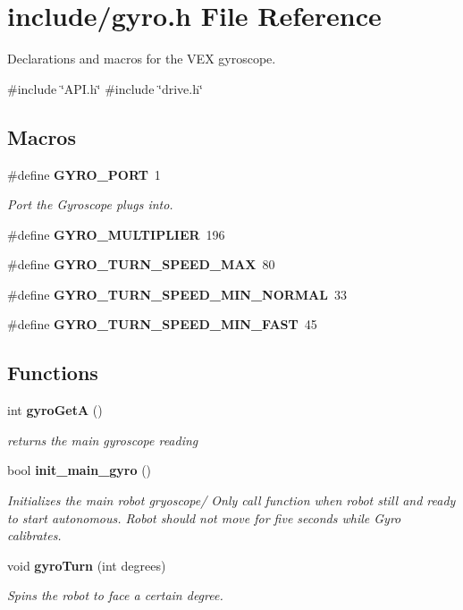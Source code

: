 \section{include/gyro.h File Reference}
\label{gyro_8h}


Declarations and macros for the V\+EX gyroscope.  


{\ttfamily \#include \char`\"{}A\+P\+I.\+h\char`\"{}}\newline
{\ttfamily \#include \char`\"{}drive.\+h\char`\"{}}\newline
\subsection*{Macros}
\begin{DoxyCompactItemize}
\item 
\#define \textbf{ G\+Y\+R\+O\+\_\+\+P\+O\+RT}~1
\begin{DoxyCompactList}\small\item\em Port the Gyroscope plugs into. \end{DoxyCompactList}\item 
\#define \textbf{ G\+Y\+R\+O\+\_\+\+M\+U\+L\+T\+I\+P\+L\+I\+ER}~196
\item 
\#define \textbf{ G\+Y\+R\+O\+\_\+\+T\+U\+R\+N\+\_\+\+S\+P\+E\+E\+D\+\_\+\+M\+AX}~80
\item 
\#define \textbf{ G\+Y\+R\+O\+\_\+\+T\+U\+R\+N\+\_\+\+S\+P\+E\+E\+D\+\_\+\+M\+I\+N\+\_\+\+N\+O\+R\+M\+AL}~33
\item 
\#define \textbf{ G\+Y\+R\+O\+\_\+\+T\+U\+R\+N\+\_\+\+S\+P\+E\+E\+D\+\_\+\+M\+I\+N\+\_\+\+F\+A\+ST}~45
\end{DoxyCompactItemize}
\subsection*{Functions}
\begin{DoxyCompactItemize}
\item 
int \textbf{ gyro\+GetA} ()
\begin{DoxyCompactList}\small\item\em returns the main gyroscope reading \end{DoxyCompactList}\item 
bool \textbf{ init\+\_\+main\+\_\+gyro} ()
\begin{DoxyCompactList}\small\item\em Initializes the main robot gryoscope/ Only call function when robot still and ready to start autonomous. Robot should not move for five seconds while Gyro calibrates. \end{DoxyCompactList}\item 
void \textbf{ gyro\+Turn} (int degrees)
\begin{DoxyCompactList}\small\item\em Spins the robot to face a certain degree. \end{DoxyCompactList}\end{DoxyCompactItemize}


